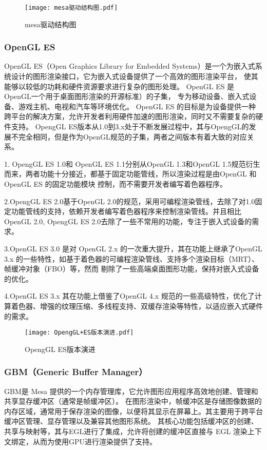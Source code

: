 \begin{figure}[h]
  \centering
  \texttt{[image: mesa驱动结构图.pdf]}
  \caption{mesa驱动结构图}\label{fig:mesa驱动结构图}
\end{figure}

\subsubsection{OpenGL ES}
OpenGL ES（Open Graphics Library for Embedded Systems）是一个为嵌入式系统设计的图形渲染接口，它为嵌入式设备提供了一个高效的图形渲染平台，
使其能够以较低的功耗和硬件资源要求进行复杂的图形处理。
OpenGL ES 是 OpenGL\cite{2005Interpretive}一个用于桌面图形渲染的开源标准）的子集，
专为移动设备、嵌入式设备、游戏主机、电视和汽车等环境优化。
OpenGL ES 的目标是为设备提供一种跨平台的解决方案，允许开发者利用硬件加速的图形渲染，同时又不需要复杂的硬件支持。
OpengGL ES版本从1.0到3.x处于不断发展过程中，其与OpengGL的发展不完全相同，但是作为OpenGL规范的子集，两者之间版本有着大致的对应关系。

1. OpengGL ES 1.0和 OpenGL ES 1.1分别从OpenGL 1.3和OpenGL 1.5规范衍生而来，两者功能十分接近，都基于固定功能管线，所以渲染过程是由OpenGL 和 OpenGL ES 的固定功能模块
控制，而不需要开发者编写着色器程序。

2.OpengGL ES 2.0基于OpenGL 2.0的规范，采用可编程渲染管线，去除了对1.0固定功能管线的支持，依赖开发者编写着色器程序来控制渲染管线。并且相比OpenGL 2.0,
OpengGL ES 2.0去除了一些不常用的功能，专注于嵌入式设备的需求。

3.OpenGL ES 3.0 是对 OpenGL 2.x 的一次重大提升，其在功能上继承了OpenGL 3.x 的一些特性，如基于着色器的可编程渲染管线、支持多个渲染目标（MRT）、帧缓冲对象（FBO）等，然而
剔除了一些高端桌面图形功能，保持对嵌入式设备的优化。

4.OpenGL ES 3.x 其在功能上借鉴了OpenGL 4.x 规范的一些高级特性，优化了计算着色器、增强的纹理压缩、多线程支持、双缓存渲染等特性，以适应嵌入式硬件的需求。

\begin{figure}[h]
  \centering
  \texttt{[image: OpengGL+ES版本演进.pdf]}
  \caption{OpengGL ES版本演进}\label{fig:OpengGL ES版本演进}
\end{figure}

\subsubsection{GBM（Generic Buffer Manager）}
GBM是 Mesa 提供的一个内存管理库，它允许图形应用程序高效地创建、管理和共享显存缓冲区（通常是帧缓冲区）。
在图形渲染中，帧缓冲区是存储图像数据的内存区域，通常用于保存渲染的图像，以便将其显示在屏幕上。其主要用于跨平台缓冲区管理、显存管理以及兼容其他图形系统。
其核心功能包括缓冲区的创建、共享与映射等，其与EGL进行了集成，允许将创建的缓冲区直接与 EGL 渲染上下文绑定，从而为使用GPU进行渲染提供了支持。

